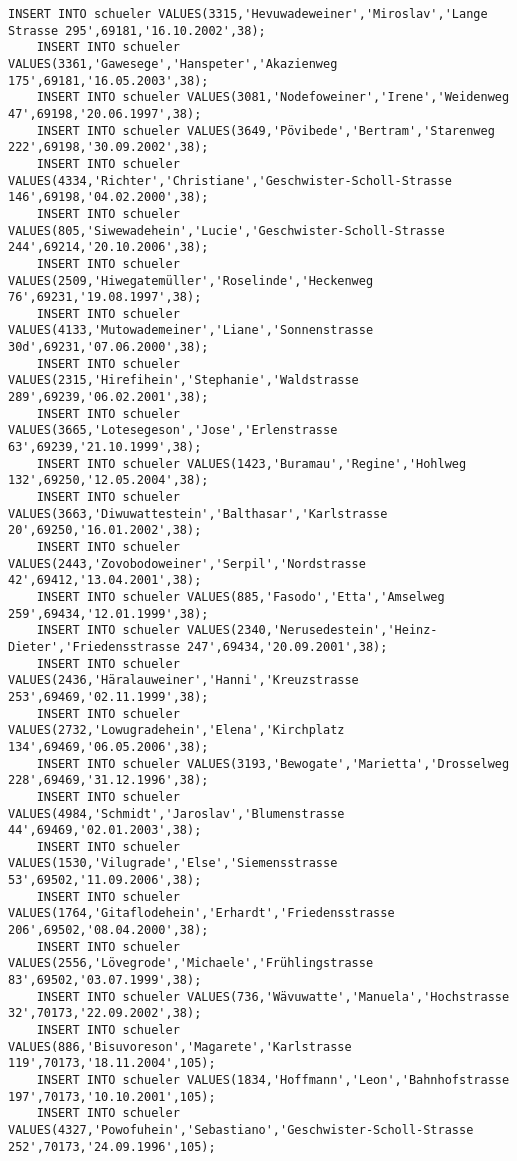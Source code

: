 \begin{lstlisting}[breaklines=True, numbers=none, basicstyle=\tiny, keepspaces=false]
	INSERT INTO schueler VALUES(3315,'Hevuwadeweiner','Miroslav','Lange Strasse 295',69181,'16.10.2002',38);
	INSERT INTO schueler VALUES(3361,'Gawesege','Hanspeter','Akazienweg 175',69181,'16.05.2003',38);
	INSERT INTO schueler VALUES(3081,'Nodefoweiner','Irene','Weidenweg 47',69198,'20.06.1997',38);
	INSERT INTO schueler VALUES(3649,'Pövibede','Bertram','Starenweg 222',69198,'30.09.2002',38);
	INSERT INTO schueler VALUES(4334,'Richter','Christiane','Geschwister-Scholl-Strasse 146',69198,'04.02.2000',38);
	INSERT INTO schueler VALUES(805,'Siwewadehein','Lucie','Geschwister-Scholl-Strasse 244',69214,'20.10.2006',38);
	INSERT INTO schueler VALUES(2509,'Hiwegatemüller','Roselinde','Heckenweg 76',69231,'19.08.1997',38);
	INSERT INTO schueler VALUES(4133,'Mutowademeiner','Liane','Sonnenstrasse 30d',69231,'07.06.2000',38);
	INSERT INTO schueler VALUES(2315,'Hirefihein','Stephanie','Waldstrasse 289',69239,'06.02.2001',38);
	INSERT INTO schueler VALUES(3665,'Lotesegeson','Jose','Erlenstrasse 63',69239,'21.10.1999',38);
	INSERT INTO schueler VALUES(1423,'Buramau','Regine','Hohlweg 132',69250,'12.05.2004',38);
	INSERT INTO schueler VALUES(3663,'Diwuwattestein','Balthasar','Karlstrasse 20',69250,'16.01.2002',38);
	INSERT INTO schueler VALUES(2443,'Zovobodoweiner','Serpil','Nordstrasse 42',69412,'13.04.2001',38);
	INSERT INTO schueler VALUES(885,'Fasodo','Etta','Amselweg 259',69434,'12.01.1999',38);
	INSERT INTO schueler VALUES(2340,'Nerusedestein','Heinz-Dieter','Friedensstrasse 247',69434,'20.09.2001',38);
	INSERT INTO schueler VALUES(2436,'Häralauweiner','Hanni','Kreuzstrasse 253',69469,'02.11.1999',38);
	INSERT INTO schueler VALUES(2732,'Lowugradehein','Elena','Kirchplatz 134',69469,'06.05.2006',38);
	INSERT INTO schueler VALUES(3193,'Bewogate','Marietta','Drosselweg 228',69469,'31.12.1996',38);
	INSERT INTO schueler VALUES(4984,'Schmidt','Jaroslav','Blumenstrasse 44',69469,'02.01.2003',38);
	INSERT INTO schueler VALUES(1530,'Vilugrade','Else','Siemensstrasse 53',69502,'11.09.2006',38);
	INSERT INTO schueler VALUES(1764,'Gitaflodehein','Erhardt','Friedensstrasse 206',69502,'08.04.2000',38);
	INSERT INTO schueler VALUES(2556,'Lövegrode','Michaele','Frühlingstrasse 83',69502,'03.07.1999',38);
	INSERT INTO schueler VALUES(736,'Wävuwatte','Manuela','Hochstrasse 32',70173,'22.09.2002',38);
	INSERT INTO schueler VALUES(886,'Bisuvoreson','Magarete','Karlstrasse 119',70173,'18.11.2004',105);
	INSERT INTO schueler VALUES(1834,'Hoffmann','Leon','Bahnhofstrasse 197',70173,'10.10.2001',105);
	INSERT INTO schueler VALUES(4327,'Powofuhein','Sebastiano','Geschwister-Scholl-Strasse 252',70173,'24.09.1996',105);

\end{lstlisting}
